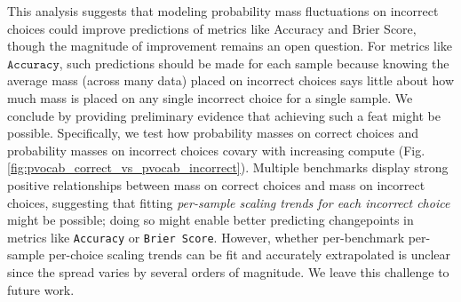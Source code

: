 This analysis suggests that modeling probability mass fluctuations on incorrect choices could improve predictions of metrics like Accuracy and Brier Score, though the magnitude of improvement remains an open question.
For metrics like $\texttt{Accuracy}$, such predictions should be made for each sample because knowing the average mass (across many data) placed on incorrect choices says little about how much mass is placed on any single incorrect choice for a single sample.
We conclude by providing preliminary evidence that achieving such a feat might be possible. Specifically, we test how probability masses on correct choices and probability masses on incorrect choices covary with increasing compute (Fig. \ref{fig:pvocab_correct_vs_pvocab_incorrect}). Multiple benchmarks display strong positive relationships between mass on correct choices and mass on incorrect choices, suggesting that fitting \textit{per-sample scaling trends for each incorrect choice} might be possible; doing so might enable better predicting changepoints in metrics like \texttt{Accuracy} or \texttt{Brier Score}. However, whether per-benchmark per-sample per-choice scaling trends can be fit and accurately extrapolated is unclear since the spread varies by several orders of magnitude. We leave this challenge to future work.
